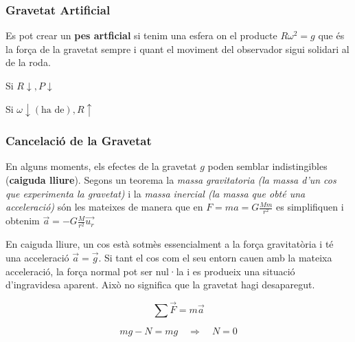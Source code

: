 \documentclass[12pt]{article}
\begin{document}
\begin{center}
\end{center}

\subsubsection{Gravetat Artificial}

Es pot crear un \textbf{pes artficial} si tenim una esfera on el producte $R\omega^2 = g$ que és la força de la gravetat sempre i quant el moviment del observador sigui solidari al de la roda.

Si $R\downarrow, P\downarrow$

Si $\omega \downarrow (\text{ha de}), R \uparrow$

\subsubsection{Cancelació de la Gravetat}

En alguns moments, els efectes de la gravetat $g$ poden semblar indistingibles (\textbf{caiguda lliure}). Segons un teorema la \textit{massa gravitatoria (la massa d'un cos que experimenta la gravetat)} i la \textit{massa inercial (la massa que obté una acceleració)} són les mateixes de manera que en $F = ma = G\frac{Mm}{r^2}$ es simplifiquen i obtenim $\vec{a} = -G\frac{M}{r^2} \vec{u_r}$

En caiguda lliure, un cos està sotmès essencialment a la força gravitatòria i té una acceleració $\vec a=\vec g$. Si tant el cos com el seu entorn cauen amb la mateixa acceleració, la força normal pot ser nul·la i es produeix una situació d’ingravidesa aparent. Això no significa que la gravetat hagi desaparegut.

\[
\sum\vec F=m\vec a
\]

\[
mg-N=mg
\quad\Longrightarrow\quad N=0
\]

\begin{center}
\end{center}
\end{document}
